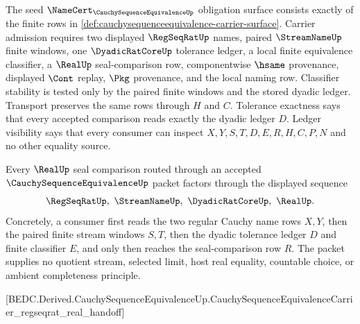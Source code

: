 \begin{theorem}
\label{thm:cauchysequenceequivalence-namecert-obligations}
The seed $\NameCert_{\CauchySequenceEquivalenceUp}$ obligation surface consists exactly of the finite rows in \autoref{def:cauchysequenceequivalence-carrier-surface}. Carrier admission requires two displayed $\RegSeqRatUp$ names, paired $\StreamNameUp$ finite windows, one $\DyadicRatCoreUp$ tolerance ledger, a local finite equivalence classifier, a $\RealUp$ seal-comparison row, componentwise $\hsame$ provenance, displayed $\Cont$ replay, $\Pkg$ provenance, and the local naming row. Classifier stability is tested only by the paired finite windows and the stored dyadic ledger. Transport preserves the same rows through $H$ and $C$. Tolerance exactness says that every accepted comparison reads exactly the dyadic ledger $D$. Ledger visibility says that every consumer can inspect $X,Y,S,T,D,E,R,H,C,P,N$ and no other equality source.
\end{theorem}

\begin{theorem}
\label{thm:cauchysequenceequivalence-regseqrat-real-handoff}
Every $\RealUp$ seal comparison routed through an accepted $\CauchySequenceEquivalenceUp$ packet factors through the displayed sequence
$$
\RegSeqRatUp,\ \StreamNameUp,\ \DyadicRatCoreUp,\ \RealUp .
$$
Concretely, a consumer first reads the two regular Cauchy name rows $X,Y$, then the paired finite stream windows $S,T$, then the dyadic tolerance ledger $D$ and finite classifier $E$, and only then reaches the seal-comparison row $R$. The packet supplies no quotient stream, selected limit, host real equality, countable choice, or ambient completeness principle.
\end{theorem}

[BEDC.Derived.CauchySequenceEquivalenceUp.CauchySequenceEquivalenceCarrier\_regseqrat\_real\_handoff]

